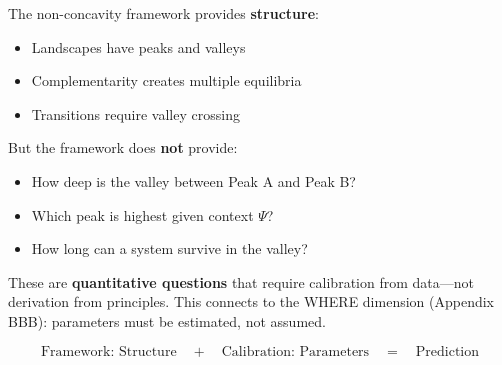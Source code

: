 The non-concavity framework provides \textbf{structure}:
\begin{itemize}
\item Landscapes have peaks and valleys
\item Complementarity creates multiple equilibria
\item Transitions require valley crossing
\end{itemize}

But the framework does \textbf{not} provide:
\begin{itemize}
\item How deep is the valley between Peak A and Peak B?
\item Which peak is highest given context $\Psi$?
\item How long can a system survive in the valley?
\end{itemize}

These are \textbf{quantitative questions} that require calibration from data---not derivation from principles. This connects to the WHERE dimension (Appendix BBB): parameters must be estimated, not assumed.

\begin{equation}
\boxed{\text{Framework: Structure} \quad + \quad \text{Calibration: Parameters} \quad = \quad \text{Prediction}}
\end{equation}



